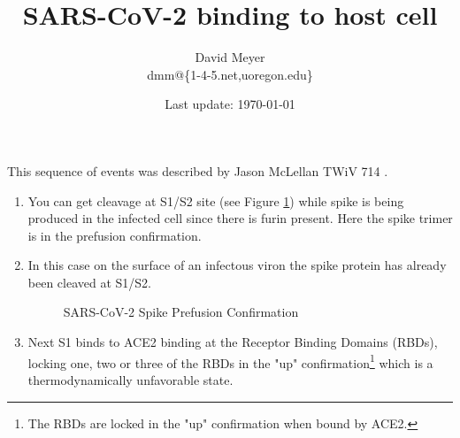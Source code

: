 \documentclass[11pt, oneside]{article}   	%
\title{SARS-CoV-2 binding to host cell}
\author{David Meyer \\ dmm@\{1-4-5.net,uoregon.edu\}}
\date{Last update: \today}							%
\begin{document}
\maketitle

\noindent
This sequence of events was described by Jason McLellan TWiV 714 \cite{covid:spike}.

\begin{enumerate}
\item You can get cleavage at S1/S2 site (see Figure \ref{fig:prefusion}) while spike is being produced in the
infected cell since there is	furin present. Here the spike trimer is in the prefusion confirmation.

\item In this case on the surface of an infectous viron the spike protein has already been cleaved at S1/S2. 

\bigskip
\begin{figure} [H]
\caption{SARS-CoV-2 Spike Prefusion Confirmation \cite{covid:prefusion}}
\label{fig:prefusion}
\end{figure}


\item  Next S1 binds to ACE2 binding at the Receptor Binding Domains (RBDs),
locking one, two or three of the RBDs in the "up" confirmation\footnote{The RBDs are locked 
in the "up" confirmation when bound by ACE2.} which is a thermodynamically unfavorable state.


\end{enumerate}
\end{document}
